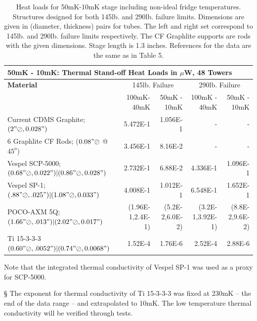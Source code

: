 \documentclass{article}
\begin{document}
\begin{table}[h]
\begin{small}
\begin{threeparttable}
\begin{tabular}{lrrrr}
  \multicolumn{5}{l}{{\Large 50mK - 10mK: Thermal Stand-off Heat Loads in $\mu$W, 48 Towers}} \\
\toprule
\bf{{\large Material}}& \multicolumn{2}{c}{145lb. Failure} & \multicolumn{2}{c}{290lb. Failure} \\
\cmidrule(r){2-5}
& 100mK-40mK & 50mK - 10mK & 100mK - 40mK & 50mK - 10mK \\
Current CDMS Graphite; $(2"\oslash,0.028")$  & 5.472E-1 & 1.056E-1 & - & - \\
6 Graphlite CF Rods; ($0.08" \oslash$ @ $45^{o}$) & 3.456E-1 & 8.16E-2 & - & - \\
Vespel SCP-5000; $(0.68"\oslash,0.022")|(0.86"\oslash,0.028")$ & 2.732E-1\tnote{\dag} & 6.88E-2\tnote{\dag} & 4.336E-1\tnote{\dag} & 1.096E-1\tnote{\dag} \\
Vespel SP-1; $(.88"\oslash,.025")|(1.08"\oslash,0.033")$ & 4.008E-1 & 1.012E-1 & 6.548E-1 & 1.652E-1 \\
POCO-AXM 5Q; $(1.66"\oslash,.013")|(2.02"\oslash,0.017")$ & (1.96E-1,2.4E-1) & (5.2E-2,6.0E-2) & (3.2E-1,3.92E-1) & (8.8E-2,9.6E-2) \\
Ti 15-3-3-3 $(0.60"\oslash,.0052")|(0.74"\oslash,0.0068")$ & 1.52E-4\tnote{\S} & 1.76E-6\tnote{\S} & 2.52E-4\tnote{\S} & 2.88E-6\tnote{\S} \\
\bottomrule
\end{tabular}
\begin{tablenotes}
\item[\dag] Note that the integrated thermal conductivity of Vespel SP-1 was used as a proxy for SCP-5000.
\item[\S] The exponent for thermal conductivity of Ti 15-3-3-3 was fixed at 230mK -- the end of the data range -- and extrapolated to 10mK. The low temperature thermal conductivity will be verified through tests.
\end{tablenotes}
\end{threeparttable}
\caption{Heat loads for 50mK-10mK stage including non-ideal fridge temperatures. Structures designed for both 145lb. and 290lb. failure limits. Dimensions are given in (diameter, thickness) pairs for tubes. The left and right set correspond to 145lb. and 290lb. failure limits respectively. The CF Graphlite supports are rods with the given dimensions. Stage length is 1.3 inches. References for the data are the same as in Table 5.}
\end{small}
\end{table}
\end{document}
